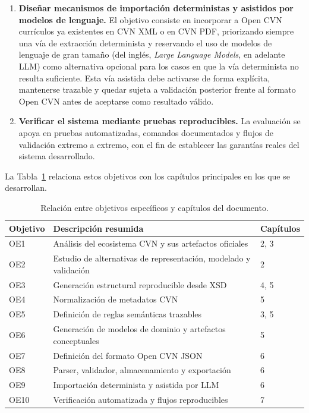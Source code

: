 \begin{enumerate}
  \item \textbf{Diseñar mecanismos de importación deterministas y asistidos por
  modelos de lenguaje.} El objetivo consiste en incorporar a Open CVN currículos ya
  existentes en CVN XML o en CVN PDF, priorizando siempre una vía de extracción
  determinista y reservando el uso de modelos de lenguaje de gran tamaño (del
  inglés, \textit{Large Language Models}, en adelante LLM) como alternativa
  opcional para los casos en que la vía determinista no resulta suficiente. Esta
  vía asistida debe activarse de forma explícita, mantenerse trazable y quedar
  sujeta a validación posterior frente al formato Open CVN antes de aceptarse como
  resultado válido.

  \item \textbf{Verificar el sistema mediante pruebas reproducibles.} La
  evaluación se apoya en pruebas automatizadas, comandos documentados y flujos de
  validación extremo a extremo, con el fin de establecer las garantías reales del
  sistema desarrollado.
\end{enumerate}

La Tabla~\ref{tab:objetivos_capitulos} relaciona estos objetivos con los
capítulos principales en los que se desarrollan.

\begin{table}[htbp]
  \centering
  \footnotesize
  \renewcommand{\arraystretch}{1.55}
  \caption{Relación entre objetivos específicos y capítulos del documento.}
  \label{tab:objetivos_capitulos}
  \begin{tabular}{p{} p{} p{}}
    \hline
    \textbf{Objetivo} & \textbf{Descripción resumida} & \textbf{Capítulos} \\
    \hline
    OE1 & Análisis del ecosistema CVN y sus artefactos oficiales & 2, 3 \\
    OE2 & Estudio de alternativas de representación, modelado y validación & 2 \\
    OE3 & Generación estructural reproducible desde XSD & 4, 5 \\
    OE4 & Normalización de metadatos CVN & 5 \\
    OE5 & Definición de reglas semánticas trazables & 3, 5 \\
    OE6 & Generación de modelos de dominio y artefactos conceptuales & 5 \\
    OE7 & Definición del formato Open CVN JSON & 6 \\
    OE8 & Parser, validador, almacenamiento y exportación & 6 \\
    OE9 & Importación determinista y asistida por LLM & 6 \\
    OE10 & Verificación automatizada y flujos reproducibles & 7 \\
    \hline
  \end{tabular}
\end{table}

